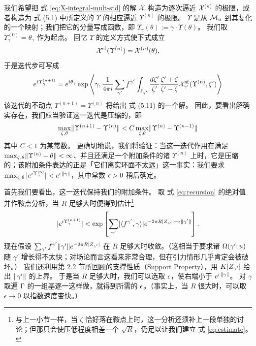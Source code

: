 我们希望把 式 \eqref{eq:X-integral-mult-std} 的解 $\mathcal{X}$ 构造为逐次逼近 $\mathcal{X}^{(n)}$ 的极限，或者构造为 式 (5.1) 中所定义的 $\Upsilon$ 的相应逼近 $\Upsilon^{(n)}$ 的极限。%
$\Upsilon$ 是从 $\mathcal{M}_u$ 到其复化的一个映射；我们把它的分量写成函数，即 $\Upsilon_\gamma(\theta) := \gamma \cdot \Upsilon(\theta)$。
我们取 $\Upsilon^{(0)}_\gamma = \theta_\gamma$ 作为起点。
回忆 $\Upsilon$ 的定义方式使下式成立
\begin{equation}
\mathcal{X}^{\mathrm{sf}}(\Upsilon^{(n)}) = \mathcal{X}^{(n)}(\theta),
\end{equation}
于是迭代步可写成
\begin{equation} \label{eq:recursion}
e^{i \Upsilon^{(n+1)}_\gamma} = e^{i \theta_\gamma} \exp \left\langle \gamma,
\frac{1}{4 \pi i} \sum_{\gamma'} f^{\gamma'} \int_{\ell_{\gamma'}}
\frac{d\zeta'}{\zeta'} \frac{\zeta' + \zeta}{\zeta' - \zeta}
\mathcal{X}^{\mathrm{sf}}_{\gamma'}(\Upsilon^{(n)},\zeta')\right\rangle
\end{equation}
该迭代的不动点 $\Upsilon^{(n+1)} = \Upsilon^{(n)}$ 将给出 式 (5.11) 的一个解。%
因此，要看出解确实存在，我们应当验证这一迭代是压缩的，即
\begin{equation}
\max_{\zeta,\theta} \lVert \Upsilon^{(n+1)} - \Upsilon^{(n)} \rVert < C \max_{\zeta,\theta} \lVert \Upsilon^{(n)} - \Upsilon^{(n-1)} \rVert
\end{equation}
其中 $C < 1$ 为某常数。
更确切地说，我们将验证：当这一迭代作用在满足 $\max_{\zeta,\theta} \lVert \Upsilon^{(n)} - \theta \rVert < \infty$、并且还满足一个附加条件的诸 $\Upsilon^{(n)}$ 上时，它是压缩的；该附加条件表达的正是「它们离实环面不太远」这一事实：我们要求
$\max_{\zeta,\theta} |e^{i \Upsilon^{(n)}_\gamma}|<e^{\epsilon \lVert \gamma \rVert}$，其中常数 $\epsilon>0$ 稍后确定。

首先我们要看出，这一迭代保持我们的附加条件。
取 式 \eqref{eq:recursion} 的绝对值并作鞍点分析，当 $R$ 足够大时便得到估计\footnote{与上一小节一样，当 $\zeta$ 恰好落在鞍点上时，这一分析还须补上一段单独的讨论；但那只会使压低程度相差一个 $\sqrt{R}$，仍足以让我们建立 式 \eqref{eq:estimate}。}
\begin{equation} \label{eq:estimate}
|e^{i \Upsilon^{(n+1)}_\gamma}| <  \exp \left[ \sum_{\gamma'} \lvert \langle f^{\gamma'},\gamma \rangle \rvert
e^{- 2 \pi R |Z_{\gamma'}| + \epsilon \lVert \gamma' \rVert} \right].
\end{equation}
现在假设 $\sum_{\gamma'} f^{\gamma'} \lVert \gamma' \rVert e^{- 2 \pi R |Z_{\gamma'}|}$ 在 $R$ 足够大时收敛。（这相当于要求诸 $\Omega(\gamma';u)$ 随 $\gamma'$ 增长得不太快；对场论而言这看来非常合理，但在引力情形几乎肯定会被破坏。）
我们还利用第 2.2 节所回顾的支撑性质（Support Property），用 $K \lvert Z_{\gamma'} \rvert$ 给出 $\lVert \gamma' \rVert$ 的上界。%
于是当 $R$ 足够大时，我们可以选取 $\epsilon$，使右端小于 $e^{\epsilon \lVert \gamma \rVert}$。
对 $\gamma$ 取遍 $\Gamma$ 的一组基逐一这样做，就得到所需的 $\epsilon$。（事实上，当 $R$ 很大时，可以取 $\epsilon \to 0$ 以指数速度变快。）

